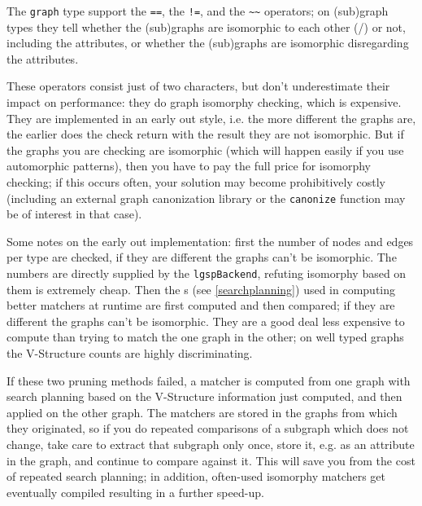 The \texttt{graph} type support the \texttt{==}, the \texttt{!=}, and the \texttt{\textasciitilde\textasciitilde} operators;
on (sub)graph types they tell whether the (sub)graphs are isomorphic to each other (/) or not, including the attributes, or whether the (sub)graphs are isomorphic disregarding the attributes.

These operators consist just of two characters, but don't underestimate their impact on performance:
they do graph isomorphy checking, which is expensive.
They are implemented in an early out style, i.e. the more different the graphs are, the earlier does the check return with the result they are not isomorphic.
But if the graphs you are checking are isomorphic (which will happen easily if you use automorphic patterns), then you have to pay the full price for isomorphy checking; if this occurs often, your solution may become prohibitively costly (including an external graph canonization library or the \texttt{canonize} function may be of interest in that case).

Some notes on the early out implementation: first the number of nodes and edges per type are checked, if they are different the graphs can't be isomorphic. The numbers are directly supplied by the \texttt{lgspBackend}, refuting isomorphy based on them is extremely cheap.
Then the s (see \ref{searchplanning}) used in computing better matchers at runtime are first computed and then compared; if they are different the graphs can't be isomorphic. They are a good deal less expensive to compute than trying to match the one graph in the other; on well typed graphs the V-Structure counts are highly discriminating.

If these two pruning methods failed, a matcher is computed from one graph with search planning based on the V-Structure information just computed, and then applied on the other graph.
The matchers are stored in the graphs from which they originated, so if you do repeated comparisons of a subgraph which does not change, take care to extract that subgraph only once, store it, e.g. as an attribute in the graph, and continue to compare against it. 
This will save you from the cost of repeated search planning; in addition, often-used isomorphy matchers get eventually compiled resulting in a further speed-up.


